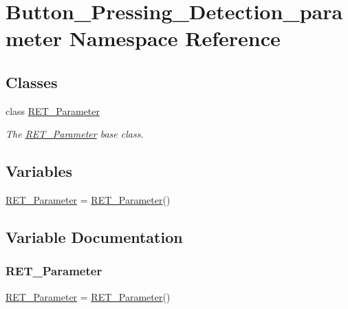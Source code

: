 \hypertarget{a00022}{}\section{Button\+\_\+\+Pressing\+\_\+\+Detection\+\_\+parameter Namespace Reference}
\label{a00022}
\subsection*{Classes}
\begin{DoxyCompactItemize}
\item 
class \hyperlink{a00037}{R\+E\+T\+\_\+\+Parameter}
\begin{DoxyCompactList}\small\item\em The \hyperlink{a00037}{R\+E\+T\+\_\+\+Parameter} base class. \end{DoxyCompactList}\end{DoxyCompactItemize}
\subsection*{Variables}
\begin{DoxyCompactItemize}
\item 
\hyperlink{a00022_a429b502173d8e27264c8a2e0ce50d6d3}{R\+E\+T\+\_\+\+Parameter} = \hyperlink{a00037}{R\+E\+T\+\_\+\+Parameter}()
\end{DoxyCompactItemize}


\subsection{Variable Documentation}
\mbox{\label{a00022_a429b502173d8e27264c8a2e0ce50d6d3}} 
\subsubsection{\texorpdfstring{R\+E\+T\+\_\+\+Parameter}{RET\_Parameter}}
{\footnotesize\ttfamily \hyperlink{a00037}{R\+E\+T\+\_\+\+Parameter} = \hyperlink{a00037}{R\+E\+T\+\_\+\+Parameter}()}

